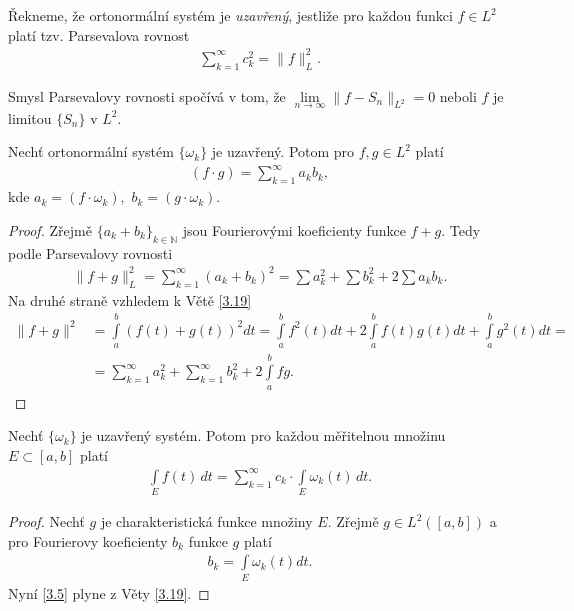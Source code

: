 \begin{definition}\label{d_3.18_Uzavreny_Ortonormalni_System}
Řekneme, že ortonormální systém je \textit{uzavřený}, jestliže pro každou funkci $f \in L^2$ platí tzv. Parsevalova rovnost
\begin{align*}
\sum \limits _{k=1}^{\infty} c_k^2 = \|f\|_L^2.
\end{align*}
\end{definition}
\begin{poznamka}
Smysl Parsevalovy rovnosti spočívá v tom, že $\lim \limits _{n \rightarrow \infty} \| f - S_n \|_{L^2} = 0$ neboli $f$ je limitou $\{S_n\}$ v $L^2$.
\end{poznamka}
\begin{theorem}\label{3.19}
Nechť ortonormální systém $\{ \omega_k \}$ je uzavřený. Potom pro $f,g \in L^2$ platí
\begin{align*}
(f \cdot g) = \sum \limits _{k=1}^{\infty} a_k b_k,
\end{align*}
kde $a_k = (f \cdot \omega_k),$ $b_k = (g \cdot \omega_k)$.
\end{theorem}
\begin{proof}
Zřejmě $\{ a_k + b_k \}_{k \in \mathbb{N}}$ jsou Fourierovými koeficienty funkce $f + g$. Tedy podle Parsevalovy rovnosti
\begin{align*}
\|f + g\|_L^2 = \sum \limits _{k=1}^{\infty} (a_k + b_k)^2 = \sum a_k^2 + \sum b_k^2 + 2 \sum a_k b_k.
\end{align*}
Na druhé straně vzhledem k Větě \ref{3.19}
\begin{align*}
\|f + g\|^2 &= \int \limits_a^b (f(t) + g(t))^2 dt = \int \limits_a^b f^2(t) dt + 2 \int \limits_a^b f(t) g(t) dt + \int \limits_a^b g^2(t) dt =\\
&= \sum \limits _{k=1}^\infty a_k^2 + \sum \limits _{k=1}^\infty b_k^2 + 2 \int \limits_a^b f g.
\end{align*}
\end{proof}


\begin{dusledek}\label{3.20.dusledek}
Nechť $\{ \omega_k \}$ je uzavřený systém. Potom pro každou měřitelnou množinu $E \subset [a,b]$ platí
\begin{align}\label{3.5}
\int \limits_E f(t) \, dt = \sum \limits _{k=1}^{\infty} c_k \cdot \int \limits_E \omega_k (t) \, dt.
\end{align}
\end{dusledek}

\begin{proof}
Nechť $g$ je charakteristická funkce množiny $E$. Zřejmě $g \in L^2([a,b])$ a pro Fourierovy koeficienty $b_k$ funkce $g$ platí
\begin{align*}
b_k = \int \limits_E \omega_k (t) dt.
\end{align*}
Nyní \ref{3.5} plyne z Věty \ref{3.19}.
\end{proof}


